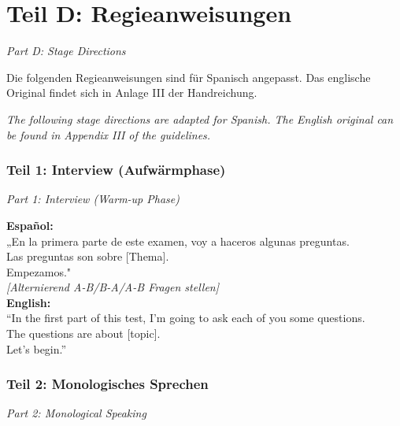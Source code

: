 \documentclass[11pt,a4paper]{article}
\newcommand{\bipar}[2]{%
    #1\par\vspace{2pt}%
    {\small\color{englishgray}\textit{#2}}\par\vspace{8pt}%
}
\newcommand{\bisection}[2]{%
    \section{#1}%
    {\small\color{englishgray}\textit{#2}}\par\vspace{6pt}%
}
\begin{document}
\part*{\color{spanischrot}Teil D: Regieanweisungen}
{\large\color{englishgray}\textit{Part D: Stage Directions}}

\bipar{Die folgenden Regieanweisungen sind für Spanisch angepasst. Das englische Original findet sich in Anlage III der Handreichung.}{The following stage directions are adapted for Spanish. The English original can be found in Appendix III of the guidelines.}

\bisection{Teil 1: Interview (Aufwärmphase)}{Part 1: Interview (Warm-up Phase)}

\begin{tcolorbox}[colback=lightgray, colframe=spanischrot, title=Gesprächsleitung / \textit{Discussion Leader}]
\textbf{Español:}\\
„En la primera parte de este examen, voy a haceros algunas preguntas.\\
Las preguntas son sobre [Thema].\\
Empezamos."\\[0.3cm]
\textit{[Alternierend A-B/B-A/A-B Fragen stellen]}\\[0.3cm]
{\color{englishgray}\textbf{English:}\\
``In the first part of this test, I'm going to ask each of you some questions.\\
The questions are about [topic].\\
Let's begin.''}
\end{tcolorbox}

\bisection{Teil 2: Monologisches Sprechen}{Part 2: Monological Speaking}
\end{document}
